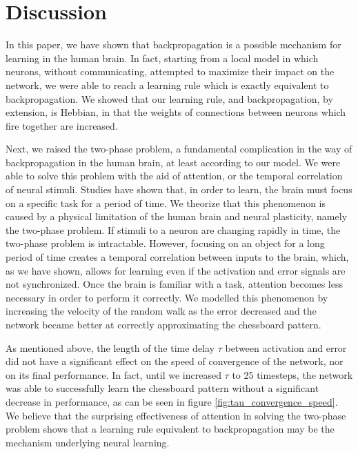 \documentclass[12pt]{article}
\begin{document}
\section{Discussion}
In this paper, we have shown that backpropagation is a possible mechanism for learning in the human brain. In fact, starting from a local model in which neurons, without communicating, attempted to maximize their impact on the network, we were able to reach a learning rule which is exactly equivalent to backpropagation. We showed that our learning rule, and backpropagation, by extension, is Hebbian, in that the weights of connections between neurons which fire together are increased. 

Next, we raised the two-phase problem, a fundamental complication in the way of backpropagation in the human brain, at least according to our model. We were able to solve this problem with the aid of attention, or the temporal correlation of neural stimuli. Studies have shown that, in order to learn, the brain must focus on a specific task for a period of time. \cite{Desimone2014} We theorize that this phenomenon is caused by a physical limitation of the human brain and neural plasticity, namely the two-phase problem. If stimuli to a neuron are changing rapidly in time, the two-phase problem is intractable. However, focusing on an object for a long period of time creates a temporal correlation between inputs to the brain, which, as we have shown, allows for learning even if the activation and error signals are not synchronized. Once the brain is familiar with a task, attention becomes less necessary in order to perform it correctly. We modelled this phenomenon by increasing the velocity of the random walk as the error decreased and the network became better at correctly approximating the chessboard pattern.

As mentioned above, the length of the time delay $\tau$ between activation and error did not have a significant effect on the speed of convergence of the network, nor on its final performance. In fact, until we increased $\tau$ to 25 timesteps, the network was able to successfully learn the chessboard pattern without a significant decrease in performance, as can be seen in figure \ref{fig:tau_convergence_speed}. We believe that the surprising effectiveness of attention in solving the two-phase problem shows that a learning rule equivalent to backpropagation may be the mechanism underlying neural learning.
\end{document}

